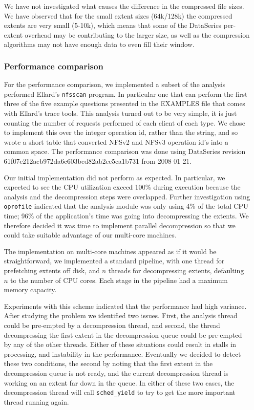 \documentclass{article}
\begin{document}
We have not investigated what causes the difference in the compressed
file sizes.  We have observed that for the small extent sizes
(64k/128k) the compressed extents are very small (5-10k), which means
that some of the DataSeries per-extent overhead may be contributing to
the larger size, as well as the compression algorithms may not have
enough data to even fill their window.

\subsubsection{Performance comparison}

For the performance comparison, we implemented a subset of the
analysis performed Ellard's \texttt{nfsscan} program. In particular one
that can perform the first three of the five example questions
presented in the EXAMPLES file that comes with Ellard's trace tools.
This analysis turned out to be very simple, it is just counting the
number of requests performed of each client of each type.  We chose to
implement this over the integer operation id, rather than the string,
and so wrote a short table that converted NFSv2 and NFSv3 operation
id's into a common space. The performance comparison was done using
DataSeries revision 61f07e212acb972da6c603bed82ab2ec5ca1b731 from
2008-01-21.

Our initial implementation did not perform as expected.  In particular,
we expected to see
the CPU utilization exceed 100\% during execution because the
analysis and the decompression steps were overlapped.  Further
investigation using \texttt{oprofile} indicated that the analysis module was
only using 4\% of the total CPU time; 96\% of the application's time
was going into decompressing the extents.  We therefore decided it was
time to implement parallel decompression so that we could take
suitable advantage of our multi-core machines.

The implementation on multi-core machines appeared as if it would be
straightforward, we implemented a standard pipeline, with one thread for
prefetching extents off disk, and $n$ threads for decompressing
extents, defaulting $n$ to the number of CPU cores.  Each stage in the
pipeline had a maximum memory capacity.

Experiments with this scheme indicated that the performance had high
variance.  After studying the problem we identified two issues.
First, the analysis thread could be pre-empted by a decompression
thread, and second, the thread decompressing the first extent in the
decompression queue could be pre-empted by any of the other threads.
Either of these situations could result in stalls in processing, and
instability in the performance.  Eventually we decided to detect
these two conditions, the second by noting that the first extent in
the decompression queue is not ready, and the current decompression
thread is working on an extent far down in the queue.  In either of
these two cases, the decompression thread will call \texttt{sched\_yield} to
try to get the more important thread running again.
\end{document}
